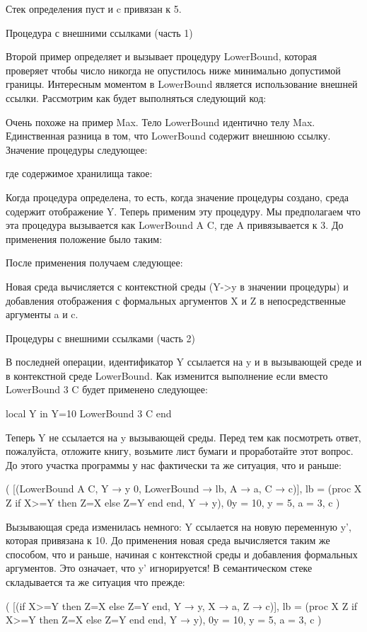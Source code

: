 Стек определения пуст и c привязан к 5.

Процедура с внешними ссылками (часть 1)

Второй пример определяет и вызывает процедуру LowerBound, которая проверяет чтобы число никогда не опустилось ниже минимально допустимой границы. Интересным моментом в LowerBound является использование внешней ссылки. Рассмотрим как будет выполняться следующий код:

Очень похоже на пример Max. Тело LowerBound идентично телу Max. Единственная разница в том, что LowerBound содержит внешнюю ссылку. Значение процедуры следующее:

где содержимое хранилища такое:

Когда процедура определена, то есть, когда значение процедуры создано, среда содержит отображение Y. Теперь применим эту процедуру. Мы предполагаем что эта процедура вызывается как {LowerBound A C}, где A привязывается к 3. До применения положение было таким:

После применения получаем следующее:

Новая среда вычисляется с контекстной среды ({Y->y} в значении процедуры) и добавления отображения с формальных аргументов X и Z в непосредственные аргументы a и c.

Процедуры с внешними ссылками (часть 2)

В последней операции, идентификатор Y ссылается на y и в вызывающей среде и в контекстной среде LowerBound. Как изменится выполнение если вместо {LowerBound 3 C} будет применено следующее:

local Y in
Y=10
{LowerBound 3 C}
end

Теперь Y не ссылается на y вызывающей среды. Перед тем как посмотреть ответ, пожалуйста, отложите книгу, возьмите лист бумаги и проработайте этот вопрос. До этого участка программы у нас фактически та же ситуация, что и раньше:

( [({LowerBound A C}, {Y → y 0, LowerBound → lb, A → a, C → c})],
{ lb = (proc { X Z} if X>=Y then Z=X else Z=Y end end, {Y → y}),
0y = 10, y = 5, a = 3, c} )

Вызывающая среда изменилась немного: Y ссылается на новую переменную y', которая привязана к 10. До применения новая среда вычисляется таким же способом, что и раньше, начиная с контекстной среды и добавления формальных аргументов. Это означает, что y' игнорируется! В семантическом стеке складывается та же ситуация что прежде:

( [(if X>=Y then Z=X else Z=Y end, {Y → y, X → a, Z → c})],
{ lb = (proc { X Z} if X>=Y then Z=X else Z=Y end end, {Y → y}),
0y = 10, y = 5, a = 3, c} )

